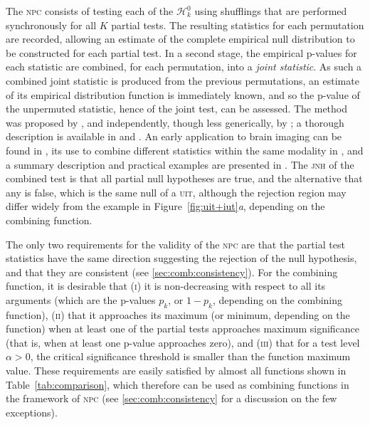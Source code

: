 The \textsc{npc} consists of testing each of the $\mathcal{H}^0_k$ using shufflings that are performed synchronously for all $K$ partial tests. The resulting statistics for each permutation are recorded, allowing an estimate of the complete empirical null distribution to be constructed for each partial test. In a second stage, the empirical p-values for each statistic are combined, for each permutation, into a \emph{joint statistic}. As such a combined joint statistic is produced from the previous permutations, an estimate of its empirical distribution function is immediately known, and so the p-value of the unpermuted statistic, hence of the joint test, can be assessed. The method was proposed by \citet{Pesarin1990, Pesarin1992}, and independently, though less generically, by \citet{Blair1994}; a thorough description is available in \citet{Pesarin2001} and \citet{Pesarin2010}. An early application to brain imaging can be found in \citet{Hayasaka2006}, its use to combine different statistics within the same modality in \citet{Hayasaka2004}, and a summary description and practical examples are presented in \citet{Brombin2013}. The \textsc{jnh} of the combined test is that all partial null hypotheses are true, and the alternative that any is false, which is the same null of a \textsc{uit}, although the rejection region may differ widely from the example in Figure~\ref{fig:uit+iut}\emph{a}, depending on the combining function.

The only two requirements for the validity of the \textsc{npc} are that the partial test statistics have the same direction suggesting the rejection of the null hypothesis, and that they are consistent (see \ref{sec:comb:consistency}). For the combining function, it is desirable that (\textsc{i}) it is non-decreasing with respect to all its arguments (which are the p-values $p_k$, or $1-p_k$, depending on the combining function), (\textsc{ii}) that it approaches its maximum (or minimum, depending on the function) when at least one of the partial tests approaches maximum significance (that is, when at least one p-value approaches zero), and (\textsc{iii}) that for a test level $\alpha > 0$, the critical significance threshold is smaller than the function maximum value. These requirements are easily satisfied by almost all functions shown in Table~\ref{tab:comparison}, which therefore can be used as combining functions in the framework of \textsc{npc} (see \ref{sec:comb:consistency} for a discussion on the few exceptions).

